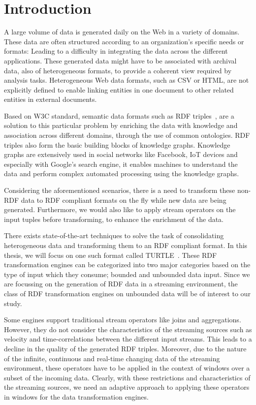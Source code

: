 \chapter{Introduction}
\label{chap:intro}

A large volume of data is generated daily on the Web in a variety of domains. These
data are often structured according to an organization's specific needs or formats: Leading to
a difficulty in integrating the data across the different applications.
These generated data might have to be associated with archival data, also of heterogeneous formats,
to provide a coherent view required by analysis tasks. Heterogeneous Web data formats, such as CSV or HTML, are not explicitly
defined to enable linking entities in one document to other related entities in external documents.

Based on W3C standard, semantic data formats such as RDF triples~\cite{intro_rdf}, are a solution to
this particular problem by enriching the data with knowledge and association across
different domains, through the use of common ontologies. RDF triples also form the basic building blocks of knowledge graphs.
Knowledge graphs are extensively used in social networks like Facebook\cite{facebook_linked_data}, IoT devices\cite{graph_of_things} and especially with Google's search
engine\cite{google_kg}, it enables machines to understand the data and perform complex automated processing
using the knowledge graphs. 

Considering the aforementioned scenarios, there is a need to transform these non-RDF data to RDF compliant formats on the fly while
new data are being generated. Furthermore, we would also like to apply stream operators on the input tuples
before transforming, to enhance the enrichment of the data.

There exists state-of-the-art techniques to solve the task of consolidating heterogeneous data
and transforming them to an RDF compliant format. In this thesis, we will focus on one such format called TURTLE~\cite{turtle_syntax}.
These RDF transformation engines can be categorized into two major categories based on the type of input
which they consume; bounded and unbounded data input. Since we are focussing on the generation of RDF data
in a streaming environment, the class of RDF transformation engines on unbounded data will be of interest to our study.

Some engines support traditional stream operators like joins and aggregations. However, they do not consider
the characteristics of the streaming sources such as velocity and time-correlations between the different
input streams. This leads to a decline in the quality of the generated RDF triples. Moreover,
due to the nature of the infinite, continuous and real-time changing data of the streaming environment,
these operators have to be applied in the context of windows over a subset of the incoming data.
Clearly, with these restrictions and characteristics of the streaming sources, we need an adaptive approach
to applying these operators in windows for the data transformation engines. 

